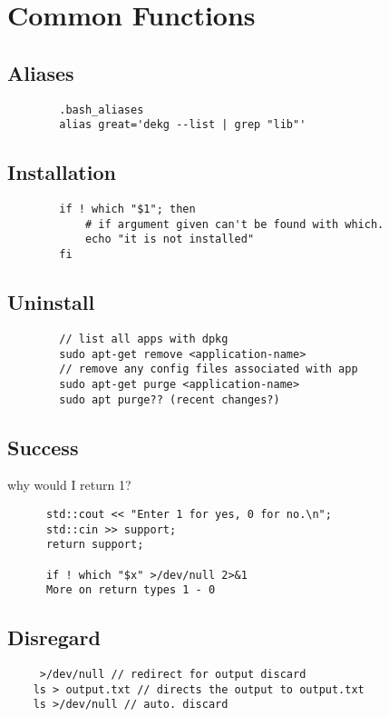 \section{Common Functions}
    \subsection{Aliases}
\begin{verbatim}
        .bash_aliases
        alias great='dekg --list | grep "lib"'
\end{verbatim}

    \subsection{Installation}
\begin{verbatim}
        if ! which "$1"; then
            # if argument given can't be found with which. 
            echo "it is not installed"
        fi
\end{verbatim}
    \subsection{Uninstall}
\begin{verbatim}
        // list all apps with dpkg
        sudo apt-get remove <application-name>
        // remove any config files associated with app
        sudo apt-get purge <application-name>
        sudo apt purge?? (recent changes?) 
\end{verbatim}
    \subsection{Success}
        why would I return 1?
\begin{verbatim}
      std::cout << "Enter 1 for yes, 0 for no.\n";
      std::cin >> support;
      return support;

      if ! which "$x" >/dev/null 2>&1
      More on return types 1 - 0
\end{verbatim}
    \subsection{Disregard}
\begin{verbatim}
     >/dev/null // redirect for output discard
    ls > output.txt // directs the output to output.txt
    ls >/dev/null // auto. discard
\end{verbatim}


